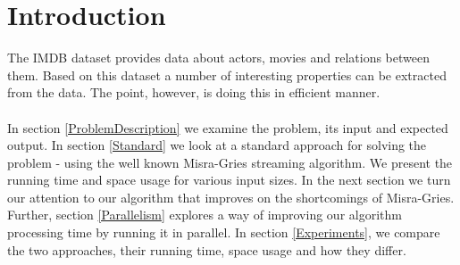 \section{Introduction}
\label{Introduction}

The IMDB dataset provides data about actors, movies and relations between them. Based on this dataset a number of interesting properties can be extracted from the data. The point, however, is doing this in efficient manner.
\\
\\
In section \ref{ProblemDescription} we examine the problem, its input and expected output. In section \ref{Standard} we look at a standard approach for solving the problem - using the well known Misra-Gries streaming algorithm. We present the running time and space usage for various input sizes. In the next section we turn our attention to our algorithm that improves on the shortcomings of Misra-Gries. Further, section \ref{Parallelism} explores a way of improving our algorithm processing time by running it in parallel. In section \ref{Experiments}, we compare the two approaches, their running time, space usage and how they differ.